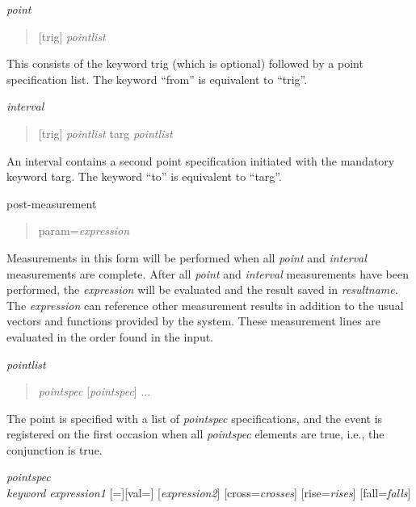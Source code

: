 \begin{description}
\item{\it point}\\
\begin{quote}
[{\vt trig}] {\it pointlist}
\end{quote}
This consists of the keyword {\vt trig} (which is optional) followed
by a point specification list.  The keyword ``{\vt from}'' is
equivalent to ``{\vt trig}''.

\item{\it interval}\\
\begin{quote}
[{\vt trig}] {\it pointlist} {\vt targ} {\it pointlist}
\end{quote}
An interval contains a second point specification initiated with the
mandatory keyword {\vt targ}.  The keyword ``{\vt to}'' is equivalent
to ``{\vt targ}''.

\item{post-measurement}\\
\begin{quote}
{\vt param=}{\it expression}
\end{quote}
Measurements in this form will be performed when all {\it point} and
{\it interval} measurements are complete.  After all {\it point} and
{\it interval} measurements have been performed, the {\it expression}
will be evaluated and the result saved in {\it resultname}.  The {\it
expression} can reference other measurement results in addition to the
usual vectors and functions provided by the system.  These measurement
lines are evaluated in the order found in the input.

\item{\it pointlist}\\
\begin{quote}
{\it pointspec} [{\it pointspec\/}] ...
\end{quote}
The point is specified with a list of {\it pointspec} specifications,
and the event is registered on the first occasion when all {\it
pointspec} elements are true, i.e., the conjunction is true.

\item{\it pointspec}\\
{\it keyword} {\it expression1} [{\vt =}][{\vt val=}] [{\it expression2\/}]
[{\vt cross=}{\it crosses\/}] [{\vt rise=}{\it rises\/}]
[{\vt fall=}{\it falls\/}]\newline
 [{\vt minx=}{\it min\_delta}] [{\vt td=}{\it delay\/}]

\end{description}

